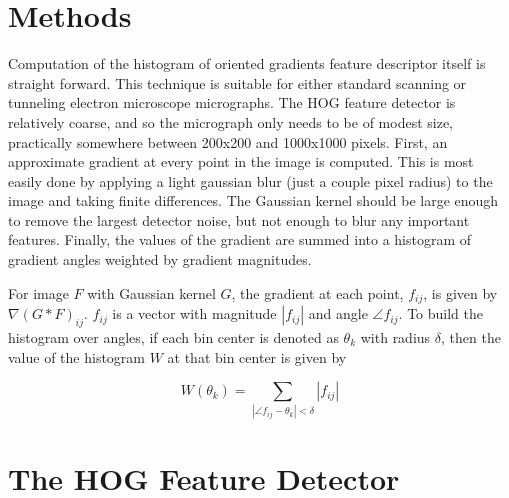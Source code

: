 \documentclass[review]{elsarticle}
\begin{document}
	

	\section{Methods}\label{methodsandmaterials}
		Computation of the histogram of oriented gradients feature descriptor itself is straight forward. This technique is suitable for either standard scanning or tunneling electron microscope micrographs. The HOG feature detector is relatively coarse, and so the micrograph only needs to be of modest size, practically somewhere between 200x200 and 1000x1000 pixels. First, an approximate gradient at every point in the image is computed. This is most easily done by applying a light gaussian blur (just a couple pixel radius) to the image and taking finite differences. The Gaussian kernel should be large enough to remove the largest detector noise, but not enough to blur any important features. Finally, the values of the gradient are summed into a histogram of gradient angles weighted by gradient magnitudes.

		For image $F$ with Gaussian kernel $G$, the gradient at each point, $f_{ij}$, is given by $\nabla \left( G \ast F \right)_{ij}$. $f_{ij}$ is a vector with magnitude $\left| f_{ij} \right|$ and angle $\angle f_{ij}$. To build the histogram over angles, if each bin center is denoted as $\theta_k$ with radius $\delta$, then the value of the histogram $W$ at that bin center is given by

		\begin{equation}
			W \left( \theta_k \right) = \sum_{\left| \angle f_{ij} - \theta_k \right| < \delta} \left| f_{ij} \right|
		\end{equation}

	\section{The HOG Feature Detector}\label{hog}
\end{document}
